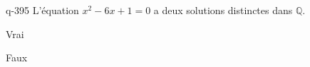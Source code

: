 \begin{truefalse}{q-395}
L'équation $x^2-6x+1=0$ a deux solutions distinctes dans $\mathbb Q$.
\item Vrai
\item* Faux
\end{truefalse}

